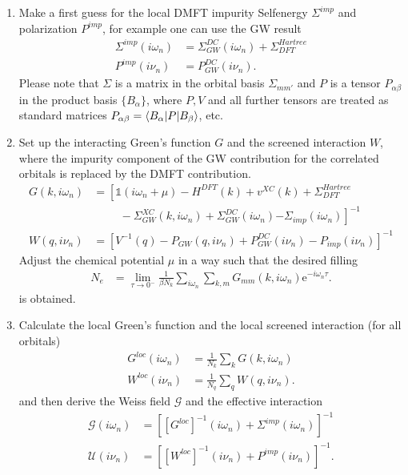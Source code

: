\documentclass[12pt,a4paper]{scrartcl}
\numberwithin{equation}{section}
\newcommand{\GF}{Green's function}
\newcommand{\unity}{\mathds{1}}
\begin{document}
\begin{enumerate}
\item Make a first guess for the local DMFT impurity Selfenergy  $\Sigma^{imp}$ and polarization $P^{imp}$, for example one can use the GW result
\begin{align}
\Sigma^{imp}(i\omega_n) &=  \Sigma^{DC}_{GW}(i\omega_n) + \Sigma^{Hartree}_{DFT} \\
P^{imp}(i\nu_n) &=  P_{GW}^{DC}(i\nu_n) .
\end{align}
Please note that $\Sigma$ is a matrix in the orbital basis $\Sigma_{mm'}$ and $P$ is a tensor
$P_{\alpha\beta}$ in the product basis $\{ B_{\alpha} \}$, where $P,V$ and all further tensors are
treated as standard matrices
$P_{\alpha\beta} = \braket{ B_{\alpha} | P | B_{\beta} }$, etc.

\item Set up the interacting {\GF} $G$ and the screened interaction $W$, where the impurity component of the GW contribution for the correlated orbitals is replaced by the DMFT contribution.
\begin{align}
 G(k,i\omega_n) 
 &= \left[ \unity(i\omega_n+\mu ) -H^{DFT}(k) + v^{XC}(k) + \Sigma^{Hartree}_{DFT} \right.\\
          & \hspace{1cm}- \Sigma^{XC}_{GW}(k,i\omega_n) 
          + \Sigma_{GW}^{DC}(i\omega_n)
          \left. - \Sigma_{imp}(i\omega_n)
           \right]^{-1} \\
%
W(q,i\nu_n) &= \left[ V^{-1}(q) - P_{GW}(q,i\nu_n) + P_{GW}^{DC}(i\nu_n) 
                              -P_{imp}(i\nu_n)\right]^{-1}
\end{align}
Adjust the chemical potential $\mu$ in a way such that the desired
filling
\begin{align}
  N_e
 &= \lim_{\tau\rightarrow 0^-} \frac{1}{\beta N_k} 
                \sum_{i\omega_n}\sum_{k,m}G_{mm}(k,i\omega_n) \mathrm{e}^{-i\omega_n\tau}.
\end{align}
is obtained.

\item Calculate the local {\GF}  and the local screened interaction (for all orbitals) 
\begin{align}
 G^{loc}(i\omega_n) &= \frac{1}{N_k}\sum_k  G(k,i\omega_n) \\
 W^{loc}(i\nu_n) &= \frac{1}{N_q}\sum_q  W(q,i\nu_n).
\end{align}
and then derive the Weiss field $\mathscr{G}$ and the effective interaction
\begin{align}
\mathscr{G}(i\omega_n) &= \left[ [G^{loc} ]^{-1}(i\omega_n) + \Sigma^{imp}(i\omega_n)\right]^{-1} \\
\mathcal{U}(i\nu_n) &= \left[ [W^{loc} ]^{-1}(i\nu_n) + P^{imp}(i\nu_n)\right]^{-1}.
\end{align}


\end{enumerate}
\end{document}
